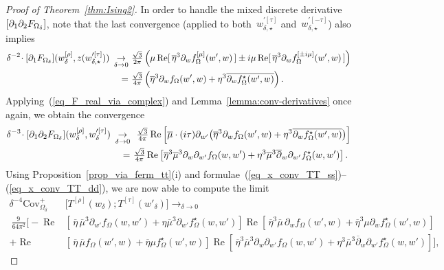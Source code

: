 \documentclass[reqno,11pt,a4paper]{amsart}
\theoremstyle{remark}
\newcommand{\Trho}{T^{[\rho]}}
\newcommand{\Ttau}{T^{[\tau]}}
\newcommand{\weta}{w^{\left[\eta \right]}}
\newcommand{\wrho}{w^{\left[\rho \right]}}
\newcommand{\wpmu}{w^{\prime[\mu]}}
\newcommand{\wpimu}{w^{\prime[i\mu]}}
\newcommand{\wptau}{w^{\prime[\tau]}}                   %
\newcommand{\wpmtau}{w^{\prime[-\tau]}}                 %
\newcommand{\f}{f_{\Omega}}
\newcommand{\fstar}{f_{\Omega}^\star}
\newcommand{\fmu}{f_{\Omega}^{[\mu]}}
\newcommand{\dOne}{\partial_1}
\newcommand{\dTwo}{\partial_2}
\renewcommand\Re{\operatorname{Re}}
\begin{document}
\begin{proof}[Proof of Theorem~\ref{thm:Ising2}]
In order to handle the mixed discrete derivative~$[\dOne\dTwo\Fdelta]$, note that the last convergence (applied to both~$\wptau_{\delta,\star}$ and~$\wpmtau_{\delta,\star}$) also implies
\begin{align*}
\delta^{-2}\!\cdot[\dOne\Fdelta](\wrho_\delta,z(\wptau_{\delta,\star}))\ 
\mathop{\to}_{\delta\to 0}&\ \tfrac{\sqrt{3}}{2\pi} \left(\mu\Re[\,\overline{\eta}^3\partial_{w}\fmu(w',w)\,] \pm i\mu \Re[\,\overline{\eta}^3\partial_{w}f_{\Omega}^{[\pm i\mu]}(w',w)\,]\right) \\
 = &\ {\tfrac{\sqrt{3}}{4\pi}}\left(\overline{\eta}^3\partial_{w}\f(w',w)+\eta^3\overline{\partial_{w}\fstar(w',w)}\right).
\end{align*}
Applying~(\ref{eq_F_real_via_complex}) and Lemma~\ref{lemma:conv-derivatives} once again, we obtain the convergence
\begin{align}
\delta^{-3}\!\cdot[\dOne\dTwo\Fdelta](\wrho_\delta,\wptau_\delta)\ \mathop{\to}_{\delta\to 0}\ & \ \tfrac{\sqrt{3}}{4\pi}\Re\left[\overline{\mu}\cdot (i\tau)\partial_{w'}\big(\overline{\eta}^3\partial_{w}\f(w',w)+\eta^3\overline{\partial_{w}\fstar(w',w)}\big)\right] \notag\\
=\ & \tfrac{\sqrt{3}}{4\pi}\Re\left[\overline{\eta}^3\overline{\mu}^3\partial_{w}\partial_{w'}\f(w,w')+ \eta^3\overline{\mu}^3\overline{\partial}_{w}\partial_{w'}\fstar(w,w')\right].
\label{eq_x_conv_TT_dd}
\end{align}
Using Proposition~\ref{prop_via_ferm_tt}(i) and formulae~(\ref{eq_x_conv_TT_ss})--(\ref{eq_x_conv_TT_dd}), we are now able to compute the limit
\begin{align*}
\delta^{-4}\mathrm{Cov}_{\Omega_\delta}^+&\big[\Trho(w_\delta);\Ttau(w'_\delta)\big] \mathop{\to}_{\delta\to 0} \\
  ~\tfrac{9\,}{64\pi^2} \big[-\Re&[\,\overline{\eta}\,\overline{\mu}^3\partial_{w'}\f(w,w')+\eta\overline{\mu}^3\partial_{w'}\fstar(w,w')] \Re[\,\overline{\eta}^3\overline{\mu}\,\partial_{w}\f(w',w)+\overline{\eta}^3\mu\partial_{w}\fstar(w',w)]  \\
 + \Re&[\,\overline{\eta}\,\overline{\mu}\f(w',w)+\overline{\eta}\mu\fstar(w',w)] \Re[\,\overline{\eta}^3\overline{\mu}^3\partial_{w}\partial_{w'}\f(w,w')+ \eta^3\overline{\mu}^3\overline{\partial}_{w}\partial_{w'}\fstar(w,w')]\big],
\end{align*}

\end{proof}
\end{document}
